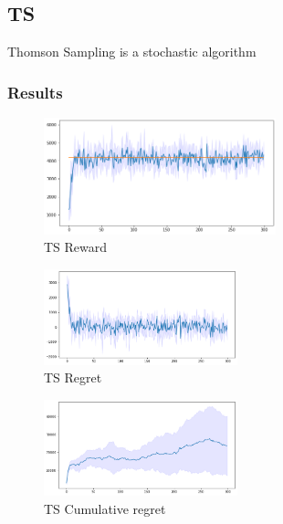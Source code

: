 \subsection{TS}
Thomson Sampling is a stochastic algorithm






\subsubsection{Results}
\begin{figure}[ht]
    \begin{center}
    \includegraphics[width=0.6\textwidth]{img/TS3.png}
    \caption{TS Reward}
    \label{fig:reward32}
    \end{center}
\end{figure}
\begin{multicols}{2}
    \begin{figure}[H]
        \begin{center}
        \includegraphics[width=0.5\textwidth]{img/TS3_regret.png}
        \caption{TS Regret}
        \label{fig:regret32}
        \end{center}
    \end{figure}
    \columnbreak
    \begin{figure}[H]
        \begin{center}
        \includegraphics[width=0.5\textwidth]{img/TS3_cum_reg.png}
        \caption{TS Cumulative regret}
        \label{fig:cum_reg32}
        \end{center}
    \end{figure}
\end{multicols}
